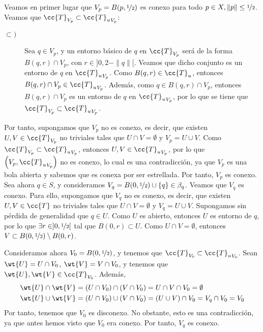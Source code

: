 \documentclass[12pt]{article}
\newcommand{\T}[0]{\cc{T}}
\begin{document}
\begin{ejercicio}[5 puntos]
\begin{enumerate}
          Veamos en primer lugar que $V_p = B(p, \nicefrac{1}{2})$ es conexo para todo
          $p\in X, \|p\|\leq \nicefrac{1}{2}$. Veamos que $\T_{V_p} \subset {\T_u}_{V_p}$:
          \begin{description}
            \item[$\subset)$] Sea $q\in V_p$, y un entorno básico de $q$ en $\T_{V_p}$ será de la forma
            $B(q,r)\cap V_p$, con $r\in ]0,2-\|q\|[$. Veamos que dicho conjunto es un entorno de
            $q$ en ${\T_u}_{V_p}$. Como $B(q,r)\in \T_u$, entonces $B(q,r)\cap V_p \in {\T_u}_{V_p}$.
            Además, como $q\in B(q,r)\cap V_p$, entonces $B(q,r)\cap V_p$ es un entorno de $q$ en ${\T_u}_{V_p}$,
            por lo que se tiene que $\T_{V_p} \subset {\T_u}_{V_p}$.
          \end{description}
          Por tanto, supongamos que $V_p$ no es conexo, es decir, que existen
          $U,V\in \T_{V_p}$ no triviales tales que $U\cap V = \emptyset$ y $V_p = U\cup V$.
          Como $\T_{V_p} \subset {\T_u}_{V_p}$, entonces $U,V\in {\T_u}_{V_p}$, por lo que
          $\left(V_p, {\T_u}_{V_p}\right)$ no es conexo, lo cual es una contradicción, ya que $V_p$ es
          una bola abierta y sabemos que es conexa por ser estrellada. Por tanto, $V_p$ es conexo.\\
          
          Sea ahora $q\in S$, y consideramos $V_q=B(0, \nicefrac{1}{2})\cup \{q\} \in \beta_q$.
          Veamos que $V_q$ es conexo. Para ello, supongamos que $V_q$ no es conexo, es decir, que existen
          $U,V\in \T$ no triviales tales que $U\cap V = \emptyset$ y $V_q = U\cup V$.
          Supongamos sin pérdida de generalidad que $q\in U$. Como $U$ es abierto, entonces
          $U$ es entorno de $q$, por lo que $\exists r\in ]0,\nicefrac{1}{2}[$ tal que $B(0,r)\subset U$.
          Como $U\cap V = \emptyset$, entonces $V\subset B(0, \nicefrac{1}{2})\setminus B(0,r)$.

          Consideramos ahora $V_0=B(0, \nicefrac{1}{2})$, y tenemos que $\T_{V_0} \subset {\T_u}_{V_0}$.
          Sean $\wt{U}=U\cap V_0$, $\wt{V}=V\cap V_0$, y tenemos que $\wt{U}, \wt{V}\in \T_{V_0}$. Además,
          \begin{align*}
            \wt{U}\cap \wt{V} &= (U\cap V_0)\cap (V\cap V_0) = U\cap V \cap V_0 = \emptyset\\
            \wt{U}\cup \wt{V} &= (U\cap V_0)\cup (V\cap V_0) = (U\cup V)\cap V_0 = V_q \cap V_0 = V_0
          \end{align*}
          Por tanto, tenemos que $V_0$ es disconexo. No obstante, esto es una contradicción, ya que
          antes hemos visto que $V_0$ era conexo. Por tanto, $V_q$ es conexo.\\


\end{enumerate}
\end{ejercicio}
\end{document}
